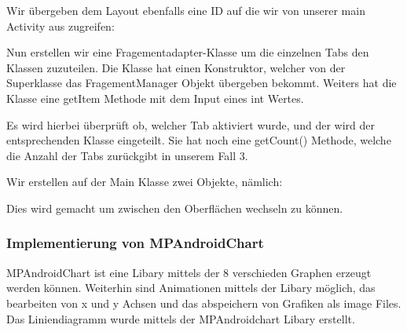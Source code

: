 

Wir übergeben dem Layout ebenfalls eine ID auf die wir von unserer main Activity aus zugreifen: 




Nun erstellen wir eine Fragementadapter-Klasse um die einzelnen Tabs den Klassen zuzuteilen. 
Die Klasse hat einen Konstruktor, welcher von der Superklasse das FragementManager Objekt übergeben bekommt.
Weiters hat die Klasse eine getItem Methode mit dem Input eines int Wertes. 



Es wird hierbei überprüft ob, welcher Tab aktiviert wurde, und der wird der entsprechenden Klasse eingeteilt. 
Sie hat noch eine getCount() Methode, welche die Anzahl der Tabs zurückgibt in unserem Fall 3.


Wir erstellen auf der Main Klasse zwei Objekte, nämlich:


Dies wird gemacht um zwischen den Oberflächen wechseln zu können.

 

\subsubsection*{Implementierung von MPAndroidChart}
MPAndroidChart ist eine Libary mittels der 8 verschieden Graphen erzeugt werden können. Weiterhin sind Animationen mittels der Libary möglich, das bearbeiten von x und y Achsen und das abspeichern von Grafiken als image Files.
Das Liniendiagramm wurde mittels der MPAndroidchart Libary erstellt.







